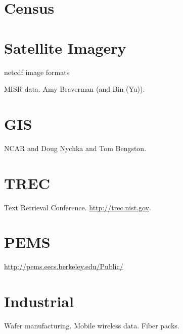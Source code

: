 \section{Census}

\section{Satellite Imagery}
netcdf
image formats

MISR data.
Amy Braverman (and Bin (Yu)).

\section{GIS}
 NCAR and Doug Nychka and Tom Bengston.


\section{TREC}
Text Retrieval Conference.
\url{http://trec.nist.gov}.


\section{PEMS}
\url{http://pems.eecs.berkeley.edu/Public/}

\section{Industrial}
Wafer manufacturing.
Mobile wireless data.
Fiber packs.
